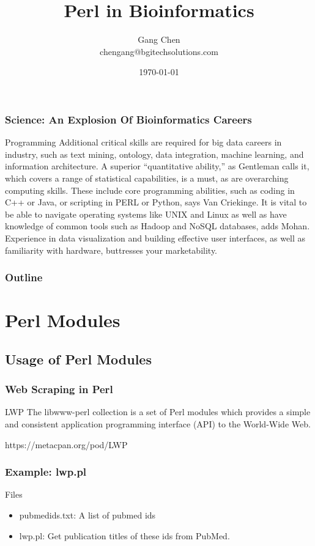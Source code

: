 \documentclass[UTF8]{beamer}
\title{Perl in Bioinformatics}
\author{Gang Chen\\ chengang@bgitechsolutions.com}
\date{\today}
\begin{document}
\begin{frame}
  \frametitle{Science: An Explosion Of Bioinformatics Careers}
\begin{block}{Programming}
  Additional critical skills are required for big data careers in industry, such
   as text mining, ontology, data integration, machine learning, and information
    architecture. A superior “quantitative ability,” as Gentleman calls it,
    which covers a range of statistical capabilities, is a must, as are
    overarching computing skills. These include core programming abilities,
    such as coding in C++ or Java, or scripting in PERL or Python, says Van
    Criekinge. It is vital to be able to navigate operating systems like UNIX
    and Linux as well as have knowledge of common tools such as Hadoop and NoSQL
     databases, adds Mohan. Experience in data visualization and building
     effective user interfaces, as well as familiarity with hardware, buttresses
      your marketability.
\end{block}
\end{frame}


\begin{frame}
\titlepage
\end{frame}
\begin{frame}[t]\frametitle{Outline}
\tableofcontents[hideallsubsections]
\end{frame}

\section{Perl Modules}

\subsection{Usage of Perl Modules}

\begin{frame}
  \frametitle{Web Scraping in Perl}
  \begin{block}{LWP}
    The libwww-perl collection is a set of Perl modules which provides a simple
    and consistent application programming interface (API) to the World-Wide Web.

    https://metacpan.org/pod/LWP
  \end{block}
\end{frame}

\begin{frame}
  \frametitle{Example: lwp.pl}
\begin{block}{Files}
  \begin{itemize}
    \item pubmedids.txt: A list of pubmed ids
    \item lwp.pl: Get publication titles of these ids from PubMed.
  \end{itemize}
\end{block}
\end{frame}
\end{document}
